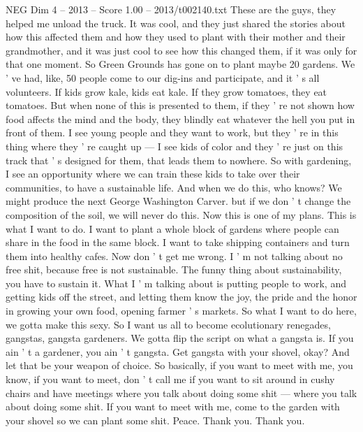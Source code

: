 \begin{textsample}{NEG Dim 4 – 2013 – Score 1.00 – 2013/t002140.txt}
These are the guys, they helped me unload the truck.
It was cool, and they just shared the stories about how this affected them and how they used to plant with their mother and their grandmother, and it was just cool to see how this changed them, if it was only for that one moment.
So Green Grounds has gone on to plant maybe 20 gardens.
We ' ve had, like, 50 people come to our dig-ins and participate, and it ' s all volunteers.
If kids grow kale, kids eat kale.
If they grow tomatoes, they eat tomatoes.
But when none of this is presented to them, if they ' re not shown how food affects the mind and the body, they blindly eat whatever the hell you put in front of them.
I see young people and they want to work, but they ' re in this thing where they ' re caught up — I see kids of color and they ' re just on this track that ' s designed for them, that leads them to nowhere.
So with gardening, I see an opportunity where we can train these kids to take over their communities, to have a sustainable life.
And when we do this, who knows?
We might produce the next George Washington Carver. but if we don ' t change the composition of the soil, we will never do this.
Now this is one of my plans.
This is what I want to do.
I want to plant a whole block of gardens where people can share in the food in the same block.
I want to take shipping containers and turn them into healthy cafes.
Now don ' t get me wrong.
I ' m not talking about no free shit, because free is not sustainable.
The funny thing about sustainability, you have to sustain it.
What I ' m talking about is putting people to work, and getting kids off the street, and letting them know the joy, the pride and the honor in growing your own food, opening farmer ' s markets.
So what I want to do here, we gotta make this sexy.
So I want us all to become ecolutionary renegades, gangstas, gangsta gardeners.
We gotta flip the script on what a gangsta is.
If you ain ' t a gardener, you ain ' t gangsta.
Get gangsta with your shovel, okay?
And let that be your weapon of choice.
So basically, if you want to meet with me, you know, if you want to meet, don ' t call me if you want to sit around in cushy chairs and have meetings where you talk about doing some shit — where you talk about doing some shit.
If you want to meet with me, come to the garden with your shovel so we can plant some shit.
Peace.
Thank you.
Thank you.

\end{textsample}

